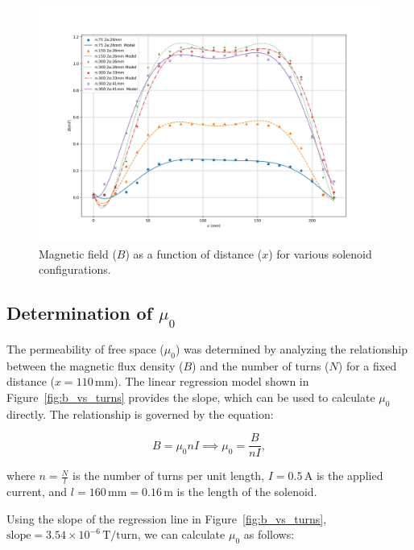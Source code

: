 \documentclass[journal]{IEEEtran}
\begin{document}
        
    
    \begin{figure}[H]
    \centering
    \includegraphics[width=\linewidth]{output_plots/Magnatic_Feilds_vs_distance.jpg}
    \caption{Magnetic field (\( B \)) as a function of distance (\( x \)) for various solenoid configurations.}
    \label{fig:fields_vs_distance}
    \end{figure}
    
    \subsection{Determination of \( \mu_0 \)}

    The permeability of free space (\( \mu_0 \)) was determined by analyzing the relationship between the magnetic flux density (\( B \)) and the number of turns (\( N \)) for a fixed distance (\( x = 110 \, \text{mm} \)). The linear regression model shown in Figure~\ref{fig:b_vs_turns} provides the slope, which can be used to calculate \( \mu_0 \) directly. The relationship is governed by the equation:
    
    \begin{equation}
        B = \mu_0 n I \implies \mu_0 = \frac{B}{n I},
    \end{equation}
    
    where \( n = \frac{N}{l} \) is the number of turns per unit length, \( I = 0.5 \, \text{A} \) is the applied current, and \( l = 160 \, \text{mm} = 0.16 \, \text{m} \) is the length of the solenoid. 
    
    Using the slope of the regression line in Figure~\ref{fig:b_vs_turns}, \( \text{slope} = 3.54 \times 10^{-6} \, \text{T/turn} \), we can calculate \( \mu_0 \) as follows:
    
\end{document}
